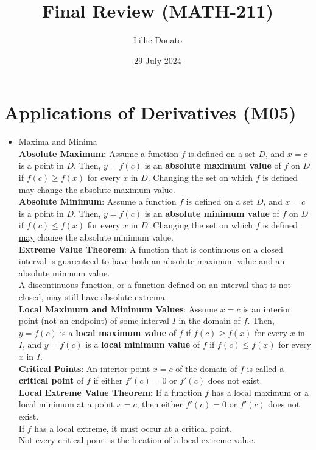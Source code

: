 \documentclass{article}
\title{Final Review (MATH-211)}
\author{Lillie Donato}
\date{29 July 2024}
\begin{document}
\maketitle

\section*{Applications of Derivatives (M05)}
\begin{itemize}
    \item Maxima and Minima \\
    \textbf{Absolute Maximum:} Assume a function $f$ is defined on a set $D$, and $x = c$ is a point in $D$. Then, $y = f(c)$ is an \textbf{absolute maximum value} of $f$ on $D$ if $f(c) \geq f(x)$ for every $x$ in $D$. Changing the set on which $f$ is defined \underline{may} change the absolute maximum value. \\
    \textbf{Absolute Minimum}: Assume a function $f$ is defined on a set $D$, and $x = c$ is a point in $D$. Then, $y = f(c)$ is an \textbf{absolute minimum value} of $f$ on $D$ if $f(c) \leq f(x)$ for every $x$ in $D$. Changing the set on which $f$ is defined \underline{may} change the absolute minimum value. \\
    \textbf{Extreme Value Theorem}: A function that is continuous on a closed interval is guarenteed to have both an absolute maximum value and an absolute minmum value. \\
    A discontinuous function, or a function defined on an interval that is not closed, may still have absolute extrema. \\
    \textbf{Local Maximum and Minimum Values}: Assume $x = c$ is an interior point (not an endpoint) of some interval $I$ in the domain of $f$. Then, $y = f(c)$ is a \textbf{local maximum value} of $f$ if $f(c) \geq f(x)$ for every $x$ in $I$, and $y = f(c)$ is a \textbf{local minimum value} of $f$ if $f(c) \leq f(x)$ for every $x$ in $I$. \\
    \textbf{Critical Points}: An interior point $x = c$ of the domain of $f$ is called a \textbf{critical point} of $f$ if either $f'(c) = 0$ or $f'(c)$ does not exist. \\
    \textbf{Local Extreme Value Theorem}: If a function $f$ has a local maximum or a local minimum at a point $x = c$, then either $f'(c) = 0$ or $f'(c)$ does not exist. \\
    If $f$ has a local extreme, it must occur at a critical point. \\
    Not every critical point is the location of a local extreme value. \\

\end{itemize}
\end{document}
